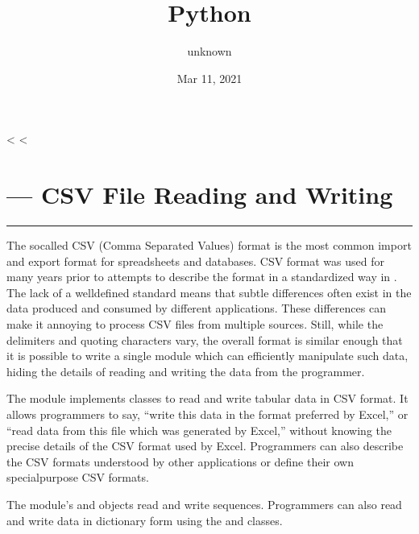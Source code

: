 \documentclass[letterpaper,10pt,english]{sphinxmanual}
\title{Python}
\date{Mar 11, 2021}
\author{unknown}
\begin{document}
\pagestyle{empty}
\sphinxmaketitle
\pagestyle{plain}
\sphinxtableofcontents
\pagestyle{normal}
\label{\detokenize{index::doc}}


<%
<%

\chapter{ — CSV File Reading and Writing}
\label{\detokenize{csv:module-csv}}\label{\detokenize{csv:csv-csv-file-reading-and-writing}}\label{\detokenize{csv::doc}}
\ignorespaces

\bigskip\hrule\bigskip


The so\sphinxhyphen{}called CSV (Comma Separated Values) format is the most common import and
export format for spreadsheets and databases.  CSV format was used for many
years prior to attempts to describe the format in a standardized way in
.  The lack of a well\sphinxhyphen{}defined standard means that subtle differences
often exist in the data produced and consumed by different applications.  These
differences can make it annoying to process CSV files from multiple sources.
Still, while the delimiters and quoting characters vary, the overall format is
similar enough that it is possible to write a single module which can
efficiently manipulate such data, hiding the details of reading and writing the
data from the programmer.

The {\hyperref[\detokenize{csv:module-csv}]{}} module implements classes to read and write tabular data in CSV
format.  It allows programmers to say, “write this data in the format preferred
by Excel,” or “read data from this file which was generated by Excel,” without
knowing the precise details of the CSV format used by Excel.  Programmers can
also describe the CSV formats understood by other applications or define their
own special\sphinxhyphen{}purpose CSV formats.

The {\hyperref[\detokenize{csv:module-csv}]{}} module’s {\hyperref[\detokenize{csv:csv.reader}]{}} and {\hyperref[\detokenize{csv:csv.writer}]{}} objects read and
write sequences.  Programmers can also read and write data in dictionary form
using the {\hyperref[\detokenize{csv:csv.DictReader}]{}} and {\hyperref[\detokenize{csv:csv.DictWriter}]{}} classes.
\end{document}
